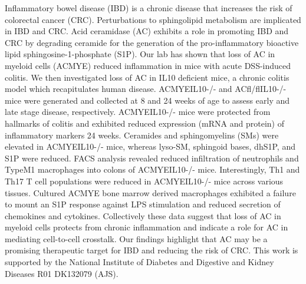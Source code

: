 Inflammatory bowel disease (IBD) is a chronic disease that increases the risk of colorectal cancer (CRC). Perturbations to sphingolipid metabolism are implicated in IBD and CRC. Acid ceramidase (AC) exhibits a role in promoting IBD and CRC by degrading ceramide for the generation of the pro-inflammatory bioactive lipid sphingosine-1-phosphate (S1P). Our lab has shown that loss of AC in myeloid cells (ACMYE) reduced inflammation in mice with acute DSS-induced colitis. We then investigated loss of AC in IL10 deficient mice, a chronic colitis model which recapitulates human disease. ACMYEIL10-/- and ACfl/flIL10-/- mice were generated and collected at 8 and 24 weeks of age to assess early and late stage disease, respectively. ACMYEIL10-/- mice were
protected from hallmarks of colitis and exhibited reduced expression (mRNA and protein) of inflammatory markers 24 weeks. Ceramides and sphingomyelins (SMs) were elevated in ACMYEIL10-/- mice, whereas lyso-SM, sphingoid bases, dhS1P, and S1P were reduced. FACS analysis revealed reduced infiltration of neutrophils and TypeM1 macrophages into colons of ACMYEIL10-/- mice. Interestingly, Th1 and Th17 T cell populations were reduced in ACMYEIL10-/- mice across various tissues. Cultured ACMYE bone marrow derived macrophages exhibited a failure to mount an S1P response against LPS stimulation and reduced secretion of chemokines and cytokines. Collectively these data suggest that loss of AC in myeloid cells protects from chronic inflammation and indicate a role for AC in mediating cell-to-cell crosstalk. Our findings highlight that AC may be a promising therapeutic target for IBD and reducing the risk of CRC. This work is supported by the National Institute of Diabetes and Digestive and Kidney Diseases R01 DK132079 (AJS).